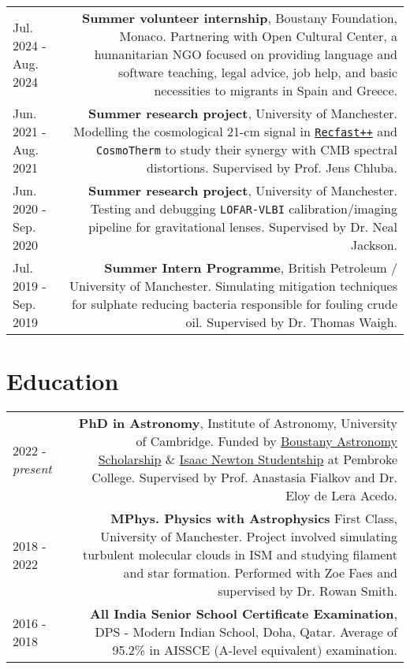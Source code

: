 \documentclass{article}
\begin{document}
\begin{tabular}{L!{\vrule}R}
    Jul. 2024 - Aug. 2024 & \textbf{Summer volunteer internship}, Boustany Foundation, Monaco. Partnering with Open Cultural Center, a humanitarian NGO focused on providing language and software teaching, legal advice, job help, and basic necessities to migrants in Spain and Greece.  \\
    Jun. 2021 - Aug. 2021 & \textbf{Summer research project}, University of Manchester. Modelling the cosmological 21-cm signal in \href{https://bitbucket.org/Jacetoto/recfast-.vx/src/Recfast_JD_21cm_modelling/}{\texttt{Recfast++}} and \texttt{CosmoTherm} to study their synergy with CMB spectral distortions. Supervised by Prof. Jens Chluba. \\
    Jun. 2020 - Sep. 2020 & \textbf{Summer research project}, University of Manchester. Testing and debugging \texttt{LOFAR-VLBI} calibration/imaging pipeline for gravitational lenses. Supervised by Dr. Neal Jackson.\\
    Jul. 2019 - Sep. 2019 & \textbf{Summer Intern Programme}, British Petroleum / University of Manchester. Simulating mitigation techniques for sulphate reducing bacteria responsible for fouling crude oil. Supervised by Dr. Thomas Waigh. \\
\end{tabular}

\section*{Education}
\begin{tabular}{L!{\vrule}R}
	2022 - \textit{present} & \textbf{PhD in Astronomy}, Institute of Astronomy, University of Cambridge. Funded by \href{https://boustany-foundation.org/scholarship-programmes/astronomy-phd-cambridge/}{Boustany Astronomy Scholarship} \& \href{https://www.cambridgetrust.org/}{Isaac Newton Studentship} at Pembroke College. Supervised by Prof. Anastasia Fialkov and Dr. Eloy de Lera Acedo. \\
	2018 - 2022 & \textbf{MPhys. Physics with Astrophysics} First Class, University of Manchester. Project involved simulating turbulent molecular clouds in ISM and studying filament and star formation. Performed with Zoe Faes and supervised by Dr. Rowan Smith. \\
	2016 - 2018 & \textbf{All India Senior School Certificate Examination}, DPS - Modern Indian School, Doha, Qatar. Average of 95.2\% in AISSCE (A-level equivalent) examination.
\end{tabular}
\end{document}
